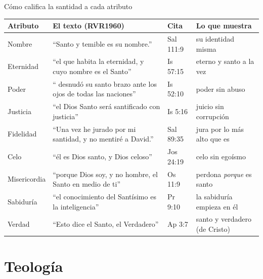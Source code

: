 \begin{frame}{Cómo califica la santidad a cada atributo}
\scriptsize\renewcommand{\arraystretch}{1.22}
\begin{tabular}{@{}>{\RaggedRight\arraybackslash}p{1.8cm}>{\RaggedRight\arraybackslash}p{6.0cm}>{\RaggedRight\arraybackslash}p{1.5cm}>{\RaggedRight\arraybackslash}p{2.3cm}@{}}
\toprule
\textbf{Atributo} & \textbf{El texto (RVR1960)} & \textbf{Cita} & \textbf{Lo que muestra} \\ \midrule
Nombre & ``Santo y temible es su nombre.'' & Sal 111:9 & su identidad misma \\
Eternidad & ``el que habita la eternidad, y cuyo nombre es el Santo'' & Is 57:15 & eterno y santo a la vez \\
Poder & ``\SENOR{} desnudó su santo brazo ante los ojos de todas las naciones'' & Is 52:10 & poder sin abuso \\
Justicia & ``el Dios Santo será santificado con justicia'' & Is 5:16 & juicio sin corrupción \\
Fidelidad & ``Una vez he jurado por mi santidad, y no mentiré a David.'' & Sal 89:35 & jura por lo más alto que es \\
Celo & ``él es Dios santo, y Dios celoso'' & Jos 24:19 & celo sin egoísmo \\
Misericordia & ``porque Dios soy, y no hombre, el Santo en medio de ti'' & Os 11:9 & perdona \emph{porque} es santo \\
Sabiduría & ``el conocimiento del Santísimo es la inteligencia'' & Pr 9:10 & la sabiduría empieza en él \\
Verdad & ``Esto dice el Santo, el Verdadero'' & Ap 3:7 & santo y verdadero (de Cristo) \\
\bottomrule
\end{tabular}\par\smallskip
{}
\end{frame}

\section{Teología}

